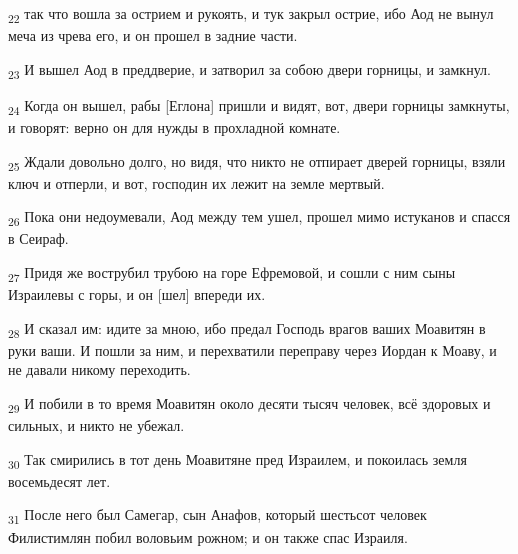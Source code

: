 \begin{tcolorbox}
\textsubscript{22} так что вошла за острием и рукоять, и тук закрыл острие, ибо Аод не вынул меча из чрева его, и он прошел в задние части.
\end{tcolorbox}
\begin{tcolorbox}
\textsubscript{23} И вышел Аод в преддверие, и затворил за собою двери горницы, и замкнул.
\end{tcolorbox}
\begin{tcolorbox}
\textsubscript{24} Когда он вышел, рабы [Еглона] пришли и видят, вот, двери горницы замкнуты, и говорят: верно он для нужды в прохладной комнате.
\end{tcolorbox}
\begin{tcolorbox}
\textsubscript{25} Ждали довольно долго, но видя, что никто не отпирает дверей горницы, взяли ключ и отперли, и вот, господин их лежит на земле мертвый.
\end{tcolorbox}
\begin{tcolorbox}
\textsubscript{26} Пока они недоумевали, Аод между тем ушел, прошел мимо истуканов и спасся в Сеираф.
\end{tcolorbox}
\begin{tcolorbox}
\textsubscript{27} Придя же вострубил трубою на горе Ефремовой, и сошли с ним сыны Израилевы с горы, и он [шел] впереди их.
\end{tcolorbox}
\begin{tcolorbox}
\textsubscript{28} И сказал им: идите за мною, ибо предал Господь врагов ваших Моавитян в руки ваши. И пошли за ним, и перехватили переправу через Иордан к Моаву, и не давали никому переходить.
\end{tcolorbox}
\begin{tcolorbox}
\textsubscript{29} И побили в то время Моавитян около десяти тысяч человек, всё здоровых и сильных, и никто не убежал.
\end{tcolorbox}
\begin{tcolorbox}
\textsubscript{30} Так смирились в тот день Моавитяне пред Израилем, и покоилась земля восемьдесят лет.
\end{tcolorbox}
\begin{tcolorbox}
\textsubscript{31} После него был Самегар, сын Анафов, который шестьсот человек Филистимлян побил воловьим рожном; и он также спас Израиля.
\end{tcolorbox}
